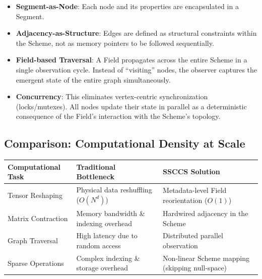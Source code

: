 \documentclass[
  a4paper,
  DIV=11,
  numbers=noendperiod]{scrartcl}
\providecommand{\tightlist}{%
  \setlength{\itemsep}{0pt}\setlength{\parskip}{0pt}}
\begin{document}
\begin{itemize}
\tightlist
\item
  \textbf{Segment-as-Node}: Each node and its properties are
  encapsulated in a Segment.
\item
  \textbf{Adjacency-as-Structure}: Edges are defined as structural
  constraints within the Scheme, not as memory pointers to be followed
  sequentially.
\item
  \textbf{Field-based Traversal}: A Field propagates across the entire
  Scheme in a single observation cycle. Instead of ``visiting'' nodes,
  the observer captures the emergent state of the entire graph
  simultaneously.
\item
  \textbf{Concurrency}: This eliminates vertex-centric synchronization
  (locks/mutexes). All nodes update their state in parallel as a
  deterministic consequence of the Field's interaction with the Scheme's
  topology.
\end{itemize}

\subsection{Comparison: Computational Density at
Scale}\label{comparison-computational-density-at-scale}

\begin{longtable}[]{@{}
  >{\raggedright\arraybackslash}p{}
  >{\raggedright\arraybackslash}p{}
  >{\raggedright\arraybackslash}p{}@{}}
\toprule\noalign{}
\begin{minipage}[b]{\linewidth}\raggedright
Computational Task
\end{minipage} & \begin{minipage}[b]{\linewidth}\raggedright
Traditional Bottleneck
\end{minipage} & \begin{minipage}[b]{\linewidth}\raggedright
SSCCS Solution
\end{minipage} \\
\midrule\noalign{}
\endhead
\bottomrule\noalign{}
\endlastfoot
Tensor Reshaping & Physical data reshuffling (\(O(N^d)\)) &
Metadata-level Field reorientation (\(O(1)\)) \\
Matrix Contraction & Memory bandwidth \& indexing overhead & Hardwired
adjacency in the Scheme \\
Graph Traversal & High latency due to random access & Distributed
parallel observation \\
Sparse Operations & Complex indexing \& storage overhead & Non-linear
Scheme mapping (skipping null-space) \\
\end{longtable}
\end{document}
